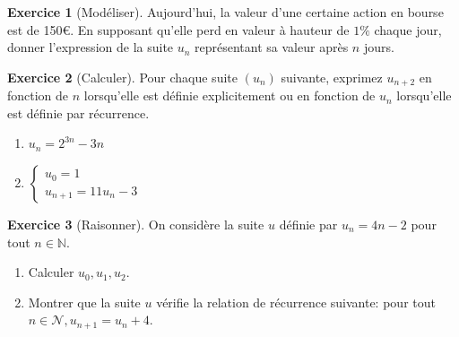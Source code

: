 \documentclass{exam}
\theoremstyle{definition}
\newtheorem{exercice}{Exercice}
\begin{document}
\begin{center}
\end{center}

\newpage
\begin{exercice}[Modéliser]
    Aujourd'hui, la valeur d'une certaine action en bourse est de 150€. En supposant qu'elle perd en valeur à hauteur de $1\%$ chaque jour, donner l'expression de la suite $u_n$ représentant sa valeur après $n$ jours.

    \begin{center}
    \end{center}
\end{exercice}

\begin{exercice}[Calculer]
    Pour chaque suite $(u_n)$ suivante, exprimez $u_{n+2}$ en fonction de $n$ lorsqu'elle est définie explicitement ou en fonction de $u_n$ lorsqu'elle est définie par récurrence.
    \begin{enumerate}
        \item $u_n = 2^{3n} - 3n$
        \item $\begin{cases} u_0 = 1\\ u_{n+1} = 11 u_n - 3\end{cases}$
    \end{enumerate}
    \begin{center}
    \end{center}
\end{exercice}

\begin{exercice}[Raisonner]
    On considère la suite $u$ définie par $u_n = 4n - 2$ pour tout $n \in \mathbb{N}$.
    \begin{enumerate}
        \item Calculer $u_0, u_1, u_2$.
        \item Montrer que la suite $u$ vérifie la relation de récurrence suivante: pour tout $n \in \mathcal{N}, u_{n+1} = u_n + 4$.
    \end{enumerate}
    \begin{center}
    \end{center}
\end{exercice}
\end{document}
